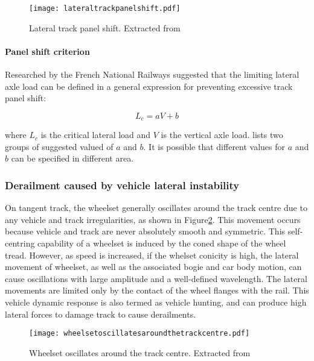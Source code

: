 \begin{figure}[h]
    \centering
    \texttt{[image: lateraltrackpanelshift.pdf]}
    \caption{Lateral track panel shift. Extracted from \cite[Figure8.27]{iwnicki2006handbook}}
    \label{fig:lateraltrackpanelshift}
\end{figure}

\paragraph{Panel shift criterion}
Researched by the French National Railways suggested that the limiting lateral axle load can be defined in a general expression for preventing excessive track panel shift:

\begin{equation}
    L_c = aV+b
\end{equation}

where $L_c$ is the critical lateral load and $V$ is the vertical axle load. \cite[Table 8.2]{iwnicki2006handbook} lists two groups of suggested valued of $a$ and $b$. It is possible that different values for $a$ and $b$ can be specified in different area.

\subsubsection{Derailment caused by vehicle lateral instability}
On tangent track, the wheelset generally oscillates around the track centre due to any vehicle and track irregularities, as shown in Figure\ref{fig:wheelsetoscillatesaroundthetrackcentre}. This movement occurs because vehicle and track are never absolutely smooth and symmetric. This self-centring capability of a wheelset is induced by the coned shape of the wheel tread. However, as speed is increased, if the whelset conicity is high, the lateral movement of wheelset, as well as the associated bogie and car body motion, can cause oscillations with large amplitude  and a well-defined wavelength. The lateral movements are limited only by the contact of the wheel flanges with the rail. This vehicle dynamic response is also termed as vehicle hunting, and can produce high lateral forces to damage track to cause derailments.

\begin{figure}[h]
    \centering
    \texttt{[image: wheelsetoscillatesaroundthetrackcentre.pdf]}
    \caption{Wheelset oscillates around the track centre. Extracted from \cite[Figure8.28]{iwnicki2006handbook}}
    \label{fig:wheelsetoscillatesaroundthetrackcentre}
\end{figure}


